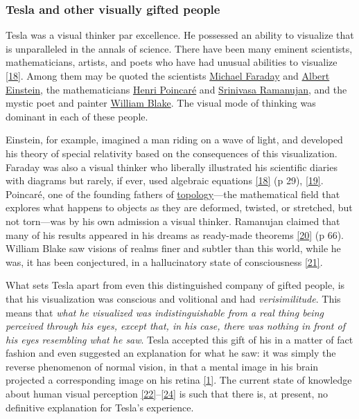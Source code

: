 \documentclass[
  a4paper,
]{article}
\begin{document}
\hypertarget{tesla-and-other-visually-gifted-people}{%
\subsubsection{Tesla and other visually gifted
people}\label{tesla-and-other-visually-gifted-people}}

Tesla was a visual thinker par excellence. He possessed an ability to
visualize that is unparalleled in the annals of science. There have been
many eminent scientists, mathematicians, artists, and poets who have had
unusual abilities to visualize \protect\hyperlink{ref-west91}{{[}18{]}}.
Among them may be quoted the scientists
\href{https://en.wikipedia.org/wiki/Michael_Faraday}{Michael Faraday}
and \href{https://en.wikipedia.org/wiki/Albert_Einstein}{Albert
Einstein}, the mathematicians
\href{https://en.wikipedia.org/wiki/Henri_Poincar\%C3\%A9}{Henri
Poincaré} and
\href{https://en.wikipedia.org/wiki/Srinivasa_Ramanujan}{Srinivasa
Ramanujan}, and the mystic poet and painter
\href{https://en.wikipedia.org/wiki/William_Blake}{William Blake}. The
visual mode of thinking was dominant in each of these people.

Einstein, for example, imagined a man riding on a wave of light, and
developed his theory of special relativity based on the consequences of
this visualization. Faraday was also a visual thinker who liberally
illustrated his scientific diaries with diagrams but rarely, if ever,
used algebraic equations \protect\hyperlink{ref-west91}{{[}18{]}} (p
29), \protect\hyperlink{ref-koestler64}{{[}19{]}}. Poincaré, one of the
founding fathers of
\href{https://mathworld.wolfram.com/Topology.html}{topology}---the
mathematical field that explores what happens to objects as they are
deformed, twisted, or stretched, but not torn---was by his own admission
a visual thinker. Ramanujan claimed that many of his results appeared in
his dreams as ready-made theorems
\protect\hyperlink{ref-kanigel91}{{[}20{]}} (p 66). William Blake saw
visions of realms finer and subtler than this world, while he was, it
has been conjectured, in a hallucinatory state of consciousness
\protect\hyperlink{ref-mckim72}{{[}21{]}}.

What sets Tesla apart from even this distinguished company of gifted
people, is that his visualization was conscious and volitional and had
\emph{verisimilitude}. This means that \emph{what he visualized was
indistinguishable from a real thing being perceived through his eyes,
except that, in his case, there was nothing in front of his eyes
resembling what he saw}. Tesla accepted this gift of his in a matter of
fact fashion and even suggested an explanation for what he saw: it was
simply the reverse phenomenon of normal vision, in that a mental image
in his brain projected a corresponding image on his retina
\protect\hyperlink{ref-john83}{{[}1{]}}. The current state of knowledge
about human visual perception
\protect\hyperlink{ref-hubel88}{{[}22{]}}--\protect\hyperlink{ref-pvi97}{{[}24{]}}
is such that there is, at present, no definitive explanation for Tesla's
experience.
\end{document}
